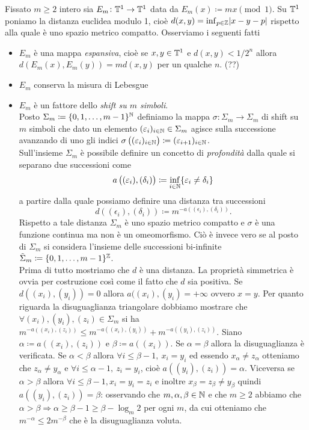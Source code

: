 \begin{example}
	Fissato $ m \geq 2 $ intero sia $ E_m \colon \mathbb{T}^1 \to \mathbb{T}^1 $ data da $ E_m(x) \coloneqq mx \pmod{1} $. Su $ \mathbb{T}^1 $ poniamo la distanza euclidea modulo 1, cioè $ d(x, y) = \inf_{p \in \mathbb{Z}} \abs{x - y - p} $ rispetto alla quale è uno spazio metrico compatto. Osserviamo i seguenti fatti
	\begin{itemize}
		\item $ E_m $ è una mappa \emph{espansiva}, cioè se $ x, y \in \mathbb{T}^1 $ e $ d(x, y) < 1/2^n $ allora $ d(E_m(x), E_m(y)) = m d(x, y) $ per un qualche $ n $. (??)
		\item $ E_m $ conserva la misura di Lebesgue 
		\item $ E_m $ è un fattore dello \emph{shift su $ m $ simboli}. \\
		Posto $ \Sigma_m \coloneqq \{0, 1, \ldots, m-1\}^{\mathbb{N}} $ definiamo la mappa $ \sigma \colon \Sigma_m \to \Sigma_m $ di shift su $ m $ simboli che dato un elemento $ (\varepsilon_i)_{i \in \mathbb{N}} \in \Sigma_m $ agisce sulla successione avanzando di uno gli indici $ \sigma\left((\varepsilon_i)_{i \in \mathbb{N}}\right) \coloneqq (\varepsilon_{i + 1})_{i \in \mathbb{N}} $. \\
		Sull'insieme $ \Sigma_m $ è possibile definire un concetto di \emph{profondità} dalla quale si separano due successioni come 
		\[
			a\left((\varepsilon_i), (\delta_i)\right) \coloneqq \inf_{i \in \mathbb{N}} \{\varepsilon_i \neq \delta_i\}
		\]
		a partire dalla quale possiamo definire una distanza tra successioni 
		\[
			d\left((\epsilon_i), (\delta_i)\right) \coloneqq m^{-a\left((\epsilon_i), (\delta_i)\right)}. 
		\]
		Rispetto a tale distanza $ \Sigma_m $ è uno spazio metrico compatto e $ \sigma $ è una funzione continua ma non è un omeomorfismo. Ciò è invece vero se al posto di $ \Sigma_m $ si considera l'insieme delle successioni bi-infinite $ \tilde{\Sigma}_m \coloneqq \{0, 1, \ldots, m-1\}^{\mathbb{Z}} $. \\
		Prima di tutto mostriamo che $ d $ è una distanza. La proprietà simmetrica è ovvia per costruzione così come il fatto che $ d $ sia positiva. Se $ d((x_i), (y_i)) = 0 $ allora $ a((x_i), (y_i) = +\infty $ ovvero $ x = y $. Per quanto riguarda la disuguaglianza triangolare dobbiamo mostrare che $ \forall (x_i), (y_i), (z_i) \in \Sigma_m $ si ha $ m^{-a((x_i),(z_i))} \leq m^{-a((x_i), (y_i))} + m^{-a((y_i), (z_i))} $. Siano $ \alpha \coloneqq a((x_i), (z_i)) $ e $ \beta \coloneqq a((x_i)) $. Se $ \alpha = \beta $ allora la disuguaglianza è verificata. Se $ \alpha < \beta $ allora $ \forall i \leq \beta-1, \ x_i = y_i $ ed essendo $ x_\alpha \neq z_\alpha $ otteniamo che $ z_\alpha \neq y_\alpha $ e $ \forall i \leq \alpha-1, \ z_i = y_i $, cioè $ a((y_i), (z_i)) = \alpha $. Viceversa se $ \alpha > \beta $ allora $ \forall i \leq \beta-1, x_i=y_i=z_i $ e inoltre $ x_\beta=z_\beta \neq y_\beta $ quindi $ a((y_i), (z_i)) = \beta $: osservando che $ m, \alpha, \beta \in \mathbb{N} $ e che $ m \geq 2 $ abbiamo che $ \alpha > \beta \Rightarrow \alpha \geq \beta - 1 \geq \beta - \log_m 2 $ per ogni $ m $, da cui otteniamo che $ m^{-\alpha} \leq 2m^{-\beta} $ che è la disuguaglianza voluta. \\

\end{itemize}
\end{example}
